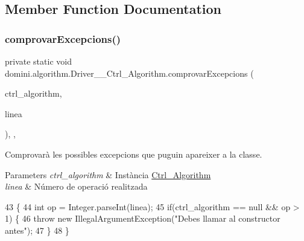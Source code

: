 \subsection{Member Function Documentation}
\mbox{\label{classdomini_1_1algorithm_1_1Driver____Ctrl__Algorithm_a38ad7761ecde80325d83ce2d2597a61b}} 
\subsubsection{\texorpdfstring{comprovar\+Excepcions()}{comprovarExcepcions()}}
{\footnotesize\ttfamily private static void domini.\+algorithm.\+Driver\+\_\+\+\_\+\+Ctrl\+\_\+\+Algorithm.\+comprovar\+Excepcions (\begin{DoxyParamCaption}\item[{\hyperlink{classdomini_1_1algorithm_1_1Ctrl__Algorithm}{Ctrl\+\_\+\+Algorithm}}]{ctrl\+\_\+algorithm,  }\item[{String}]{linea }\end{DoxyParamCaption})\hspace{0.3cm}{\ttfamily [inline]}, {\ttfamily [static]}, {\ttfamily [private]}}



Comprovarà les possibles excepcions que puguin apareixer a la classe. 


\begin{DoxyParams}{Parameters}
{\em ctrl\+\_\+algorithm} & Instància \hyperlink{classdomini_1_1algorithm_1_1Ctrl__Algorithm}{Ctrl\+\_\+\+Algorithm} \\
\hline
{\em linea} & Número de operació realitzada \\
\hline
\end{DoxyParams}

\begin{DoxyCode}
43                                                                                         \{
44         \textcolor{keywordtype}{int} op = Integer.parseInt(linea);
45         \textcolor{keywordflow}{if}(ctrl\_algorithm == null && op > 1) \{
46             \textcolor{keywordflow}{throw} \textcolor{keyword}{new} IllegalArgumentException(\textcolor{stringliteral}{"Debes llamar al constructor antes"});
47         \}
48     \}
\end{DoxyCode}
\mbox{\label{classdomini_1_1algorithm_1_1Driver____Ctrl__Algorithm_a2aa6a8b8f8c0c991a11b30e2bd1f244e}} 
